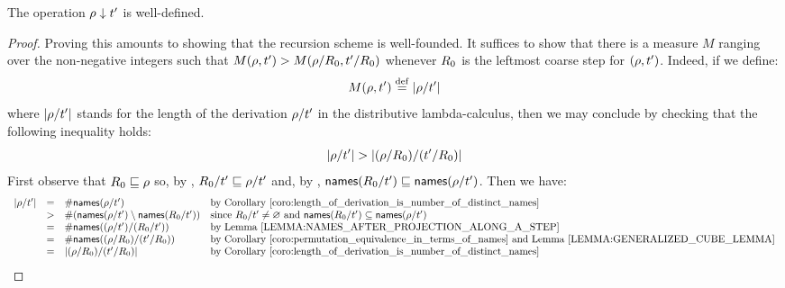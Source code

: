 \begin{lemma}
The operation $\rho \downarrow t'$ is well-defined.
\end{lemma}
\begin{proof}
Proving this amounts to showing that the recursion scheme is well-founded.
It suffices to show that there is a measure $M$ ranging over the non-negative
integers such that
$M(\rho,t') > M(\rho/R_0,t'/R_0)$
whenever $R_0$ is the leftmost coarse step for $(\rho,t')$.
Indeed, if we define:
\[
  M(\rho,t') \overset{\mathrm{def}}{=} |\rho/t'|
\]
where $|\rho/t'|$ stands for the length of the derivation $\rho/t'$
in the distributive lambda-calculus, then we may conclude by checking that the following inequality holds:
\[
  |\rho/t'| > |(\rho/R_0)/(t'/R_0)|
\]
First observe that
$R_0 \sqsubseteq \rho$
so, by ,
$R_0/t' \sqsubseteq \rho/t'$
and, by ,
$\mathsf{names}(R_0/t') \sqsubseteq \mathsf{names}(\rho/t')$.
Then we have:
\[
  \begin{array}{rcll}
  \lengthof{\redseq/\tm'}
   & = & \#\names(\redseq/\tm') & \text{by \rcoro{length_of_derivation_is_number_of_distinct_names}} \\
   & > & \#(\names(\redseq/\tm') \setminus \names(\redex_0/\tm')) & \text{since $\redex_0/\tm' \neq \emptyset$ and $\names(\redex_0/\tm') \subseteq \names(\redseq/\tm')$} \\
   & = & \#\names((\redseq/\tm') / (\redex_0/\tm')) & \text{by \rlem{names_after_projection_along_a_step}} \\
   & = & \#\names((\redseq/\redex_0) / (\tm'/\redex_0)) & \text{by \rcoro{permutation_equivalence_in_terms_of_names} and \rlem{generalized_cube_lemma}} \\
   & = & \lengthof{(\redseq/\redex_0) / (\tm'/\redex_0)} & \text{by \rcoro{length_of_derivation_is_number_of_distinct_names}}
  \end{array}
\]
\end{proof}

